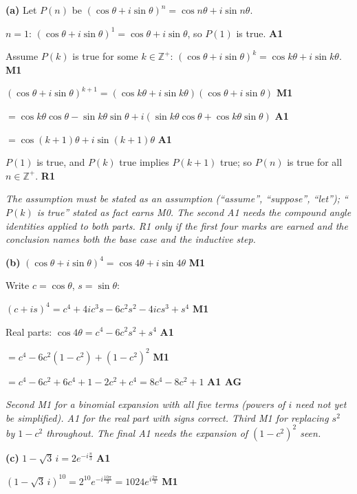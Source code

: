 \documentclass[12pt, twoside]{article}
\begin{document}
\begin{enumerate}[itemsep=0.3cm]
\textbf{(a)} Let $P(n)$ be
$(\cos\theta + i\sin\theta)^{n} = \cos n\theta + i\sin n\theta$.

$n = 1$: $(\cos\theta + i\sin\theta)^{1} = \cos\theta + i\sin\theta$, so
$P(1)$ is true. \hfill \textbf{A1}

Assume $P(k)$ is true for some $k \in \mathbb{Z}^{+}$:
$(\cos\theta + i\sin\theta)^{k} = \cos k\theta + i\sin k\theta$.
\hfill \textbf{M1}

$(\cos\theta + i\sin\theta)^{k+1}
= (\cos k\theta + i\sin k\theta)(\cos\theta + i\sin\theta)$
\hfill \textbf{M1}

$= \cos k\theta\cos\theta - \sin k\theta\sin\theta
+ i(\sin k\theta\cos\theta + \cos k\theta\sin\theta)$
\hfill \textbf{A1}

$= \cos(k + 1)\theta + i\sin(k + 1)\theta$ \hfill \textbf{A1}

$P(1)$ is true, and $P(k)$ true implies $P(k + 1)$ true; so $P(n)$ is true
for all $n \in \mathbb{Z}^{+}$. \hfill \textbf{R1}

\emph{The assumption must be stated as an assumption (``assume'',
``suppose'', ``let''); ``$P(k)$ is true'' stated as fact earns M0. The
second A1 needs the compound angle identities applied to both parts. R1
only if the first four marks are earned and the conclusion names both the
base case and the inductive step.}

\textbf{(b)} $(\cos\theta + i\sin\theta)^{4} = \cos 4\theta + i\sin 4\theta$
\hfill \textbf{M1}

Write $c = \cos\theta$, $s = \sin\theta$:

$(c + is)^{4} = c^{4} + 4ic^{3}s - 6c^{2}s^{2} - 4ics^{3} + s^{4}$
\hfill \textbf{M1}

Real parts: $\cos 4\theta = c^{4} - 6c^{2}s^{2} + s^{4}$ \hfill \textbf{A1}

$= c^{4} - 6c^{2}(1 - c^{2}) + (1 - c^{2})^{2}$ \hfill \textbf{M1}

$= c^{4} - 6c^{2} + 6c^{4} + 1 - 2c^{2} + c^{4}
= 8c^{4} - 8c^{2} + 1$ \hfill \textbf{A1 AG}

\emph{Second M1 for a binomial expansion with all five terms (powers of $i$
need not yet be simplified). A1 for the real part with signs correct.
Third M1 for replacing $s^{2}$ by $1 - c^{2}$ throughout. The final A1 needs
the expansion of $(1 - c^{2})^{2}$ seen.}

\textbf{(c)} $1 - \sqrt{3}\,i = 2e^{-i\frac{\pi}{3}}$ \hfill \textbf{A1}

$\left(1 - \sqrt{3}\,i\right)^{10} = 2^{10}e^{-i\frac{10\pi}{3}}
= 1024e^{i\frac{2\pi}{3}}$ \hfill \textbf{M1}


\end{enumerate}
\end{document}
